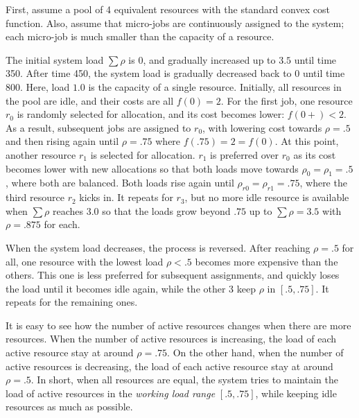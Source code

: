 First, assume a pool of 4 equivalent resources with the standard convex
cost function.
Also, assume that micro-jobs are continuously assigned to the
system; each micro-job is much smaller than the capacity of a
resource.

The initial system load $\sum \rho$ is $0$, and gradually increased up
to $3.5$ until time 350. After time 450, the system load is gradually
decreased back to $0$ until time 800.
Here, load $1.0$ is the capacity of a single resource. 
Initially, all resources in the pool are idle, and their costs are
all $f(0)= 2$.
For the first job, one resource $r_{0}$ is randomly selected for allocation, and its
cost becomes lower: $f(0+) < 2$. As a result, subsequent jobs are
assigned to $r_{0}$, with lowering cost towards $\rho = .5$ and then
rising again until $\rho = .75$ where $f(.75) = 2 = f(0)$.
At this point, another resource $r_{1}$ is selected for allocation.
$r_{1}$ is preferred over $r_{0}$ as its cost becomes lower with new
allocations so that both loads move towards $\rho_{0} = \rho_{1} = .5$,
where both are balanced.
Both loads rise again until $\rho_{r0} = \rho_{r1} = .75$,
where the third resource $r_{2}$ kicks in.
It repeats for $r_{3}$, but no more idle resource is available
when $\sum \rho$ reaches $3.0$ so that the loads grow beyond $.75$
up to $\sum \rho = 3.5$ with $\rho = .875$ for each.

When the system load decreases, the process is reversed.
After reaching $\rho = .5$ for all,
one resource with the lowest load $\rho < .5$ becomes more expensive
than the others.
This one is less preferred for subsequent assignments, and quickly
loses the load until it becomes idle again, while the other 3 keep
$\rho$ in $[.5, .75]$. It repeats for the remaining ones.

It is easy to see how the number of active resources changes when
there are more resources.
When the number of active resources is increasing, the load of each
active resource stay at around $\rho = .75$.
On the other hand, when the number of active resources is decreasing,
the load of each active resource stay at around $\rho = .5$.
In short, when all resources are equal, the system tries to maintain
the load of active resources in the {\em working load range}
$[.5, .75]$, while keeping idle resources as much as possible.

